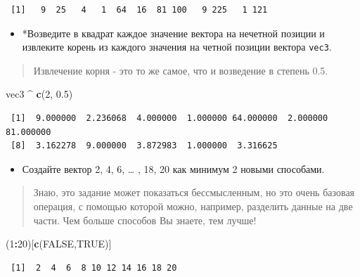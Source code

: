\documentclass[
]{book}
\newenvironment{Shaded}{\begin{snugshade}}{\end{snugshade}}
\newcommand{\DecValTok}[1]{\textcolor[rgb]{0.00,0.00,0.81}{#1}}
\newcommand{\FloatTok}[1]{\textcolor[rgb]{0.00,0.00,0.81}{#1}}
\newcommand{\KeywordTok}[1]{\textcolor[rgb]{0.13,0.29,0.53}{\textbf{#1}}}
\newcommand{\NormalTok}[1]{#1}
\newcommand{\OperatorTok}[1]{\textcolor[rgb]{0.81,0.36,0.00}{\textbf{#1}}}
\newcommand{\OtherTok}[1]{\textcolor[rgb]{0.56,0.35,0.01}{#1}}
\newcommand{\StringTok}[1]{\textcolor[rgb]{0.31,0.60,0.02}{#1}}
\providecommand{\tightlist}{%
  \setlength{\itemsep}{0pt}\setlength{\parskip}{0pt}}
\begin{document}
\begin{verbatim}
 [1]   9  25   4   1  64  16  81 100   9 225   1 121
\end{verbatim}

\begin{itemize}
\tightlist
\item
  *Возведите в квадрат каждое значение вектора на нечетной позиции и извлеките корень из каждого значения на четной позиции вектора \texttt{vec3}.
\end{itemize}

\begin{quote}
Извлечение корня - это то же самое, что и возведение в степень 0.5.
\end{quote}

\begin{Shaded}
\begin{Highlighting}[]
\NormalTok{vec3 }\OperatorTok{^}\StringTok{ }\KeywordTok{c}\NormalTok{(}\DecValTok{2}\NormalTok{, }\FloatTok{0.5}\NormalTok{)}
\end{Highlighting}
\end{Shaded}

\begin{verbatim}
 [1]  9.000000  2.236068  4.000000  1.000000 64.000000  2.000000 81.000000
 [8]  3.162278  9.000000  3.872983  1.000000  3.316625
\end{verbatim}

\begin{itemize}
\tightlist
\item
  Создайте вектор 2, 4, 6, \ldots{} , 18, 20 как минимум 2 новыми способами.
\end{itemize}

\begin{quote}
Знаю, это задание может показаться бессмысленным, но это очень базовая операция, с помощью которой можно, например, разделить данные на две части. Чем больше способов Вы знаете, тем лучше!
\end{quote}

\begin{Shaded}
\begin{Highlighting}[]
\NormalTok{(}\DecValTok{1}\OperatorTok{:}\DecValTok{20}\NormalTok{)[}\KeywordTok{c}\NormalTok{(}\OtherTok{FALSE}\NormalTok{,}\OtherTok{TRUE}\NormalTok{)]}
\end{Highlighting}
\end{Shaded}

\begin{verbatim}
 [1]  2  4  6  8 10 12 14 16 18 20
\end{verbatim}
\end{document}

